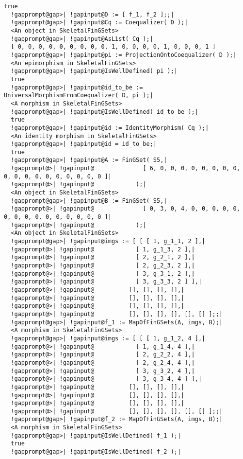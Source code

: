 \documentclass[a4paper,11pt]{report}
\begin{document}
{{{\begin{Verbatim}[commandchars=!@|,fontsize=\small,frame=single,label=Example]
  true
  !gapprompt@gap>| !gapinput@D := [ f_1, f_2 ];;|
  !gapprompt@gap>| !gapinput@Cq := Coequalizer( D );|
  <An object in SkeletalFinGSets>
  !gapprompt@gap>| !gapinput@AsList( Cq );|
  [ 0, 0, 0, 0, 0, 0, 0, 0, 0, 1, 0, 0, 0, 0, 1, 0, 0, 0, 1 ]
  !gapprompt@gap>| !gapinput@pi := ProjectionOntoCoequalizer( D );|
  <An epimorphism in SkeletalFinGSets>
  !gapprompt@gap>| !gapinput@IsWellDefined( pi );|
  true
  !gapprompt@gap>| !gapinput@id_to_be := UniversalMorphismFromCoequalizer( D, pi );|
  <A morphism in SkeletalFinGSets>
  !gapprompt@gap>| !gapinput@IsWellDefined( id_to_be );|
  true
  !gapprompt@gap>| !gapinput@id := IdentityMorphism( Cq );|
  <An identity morphism in SkeletalFinGSets>
  !gapprompt@gap>| !gapinput@id = id_to_be;|
  true
  !gapprompt@gap>| !gapinput@A := FinGSet( S5,|
  !gapprompt@>| !gapinput@              [ 6, 0, 0, 0, 0, 0, 0, 0, 0, 0, 0, 0, 0, 0, 0, 0, 0, 0, 0 ]|
  !gapprompt@>| !gapinput@            );|
  <An object in SkeletalFinGSets>
  !gapprompt@gap>| !gapinput@B := FinGSet( S5,|
  !gapprompt@>| !gapinput@              [ 0, 3, 0, 4, 0, 0, 0, 0, 0, 0, 0, 0, 0, 0, 0, 0, 0, 0, 0 ]|
  !gapprompt@>| !gapinput@            );|
  <An object in SkeletalFinGSets>
  !gapprompt@gap>| !gapinput@imgs := [ [ [ 1, g_1_1, 2 ],|
  !gapprompt@>| !gapinput@            [ 1, g_1_3, 2 ],|
  !gapprompt@>| !gapinput@            [ 2, g_2_1, 2 ],|
  !gapprompt@>| !gapinput@            [ 2, g_2_3, 2 ],|
  !gapprompt@>| !gapinput@            [ 3, g_3_1, 2 ],|
  !gapprompt@>| !gapinput@            [ 3, g_3_3, 2 ] ],|
  !gapprompt@>| !gapinput@          [], [], [], [],|
  !gapprompt@>| !gapinput@          [], [], [], [],|
  !gapprompt@>| !gapinput@          [], [], [], [],|
  !gapprompt@>| !gapinput@          [], [], [], [], [], [] ];;|
  !gapprompt@gap>| !gapinput@f_1 := MapOfFinGSets(A, imgs, B);|
  <A morphism in SkeletalFinGSets>
  !gapprompt@gap>| !gapinput@imgs := [ [ [ 1, g_1_2, 4 ],|
  !gapprompt@>| !gapinput@            [ 1, g_1_4, 4 ],|
  !gapprompt@>| !gapinput@            [ 2, g_2_2, 4 ],|
  !gapprompt@>| !gapinput@            [ 2, g_2_4, 4 ],|
  !gapprompt@>| !gapinput@            [ 3, g_3_2, 4 ],|
  !gapprompt@>| !gapinput@            [ 3, g_3_4, 4 ] ],|
  !gapprompt@>| !gapinput@          [], [], [], [],|
  !gapprompt@>| !gapinput@          [], [], [], [],|
  !gapprompt@>| !gapinput@          [], [], [], [],|
  !gapprompt@>| !gapinput@          [], [], [], [], [], [] ];;|
  !gapprompt@gap>| !gapinput@f_2 := MapOfFinGSets(A, imgs, B);|
  <A morphism in SkeletalFinGSets>
  !gapprompt@gap>| !gapinput@IsWellDefined( f_1 );|
  true
  !gapprompt@gap>| !gapinput@IsWellDefined( f_2 );|

\end{Verbatim}}}}
\end{document}
